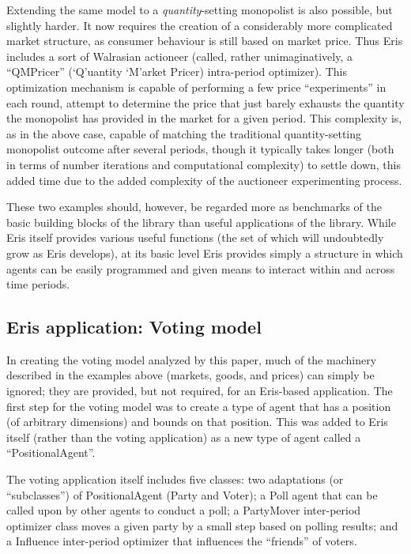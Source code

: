 \documentclass[12pt]{article}
\numberwithin{equation}{subsection}
\begin{document}
Extending the same model to a \emph{quantity}-setting monopolist is also possible, but slightly
harder.  It now requires the creation of a considerably more complicated market structure, as
consumer behaviour is still based on market price.  Thus Eris includes a sort of Walrasian actioneer
(called, rather unimaginatively, a ``QMPricer'' (`Q'uantity `M'arket Pricer) intra-period
optimizer).  This optimization mechanism is capable of performing a few price ``experiments'' in
each round, attempt to determine the price that just barely exhausts the quantity the monopolist has
provided in the market for a given period.  This complexity is, as in the above case, capable of
matching the traditional quantity-setting monopolist outcome after several periods, though it
typically takes longer (both in terms of number iterations and computational complexity) to settle
down, this added time due to the added complexity of the auctioneer experimenting process.

These two examples should, however, be regarded more as benchmarks of the basic building blocks of
the library than useful applications of the library.  While Eris itself provides various useful
functions (the set of which will undoubtedly grow as Eris develops), at its basic level Eris
provides simply a structure in which agents can be easily programmed and given means to interact within and
across time periods.

\subsection{Eris application: Voting model}

In creating the voting model analyzed by this paper, much of the machinery described in the examples
above (markets, goods, and prices) can simply be ignored; they are provided, but not required, for
an Eris-based application.  The first step for the voting model was to create a type of agent that
has a position (of arbitrary dimensions) and bounds on that position.  This was added to Eris itself
(rather than the voting application) as a new type of agent called a ``PositionalAgent''.

The voting application itself includes five classes: two adaptations (or ``subclasses'') of
PositionalAgent (Party and Voter); a Poll agent that can be called upon by other agents to conduct a
poll; a PartyMover inter-period optimizer class moves a given party by a small step based on polling
results; and a Influence inter-period optimizer that influences the ``friends'' of voters.
\end{document}
